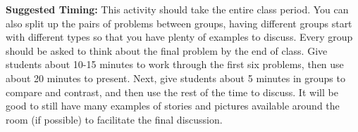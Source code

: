 \documentclass{ximera}
\begin{document}
\begin{instructorNotes}
{\bf Suggested Timing:} This activity should take the entire class period. You can also split up the pairs of problems between groups, having different groups start with different types so that you have plenty of examples to discuss. Every group should be asked to think about the final problem by the end of class. Give students about 10-15 minutes to work through the first six problems, then use about 20 minutes to present. Next, give students about 5 minutes in groups to compare and contrast, and then use the rest of the time to discuss. It will be good to still have many examples of stories and pictures available around the room (if possible) to facilitate the final discussion.

\end{instructorNotes}
\end{document}
